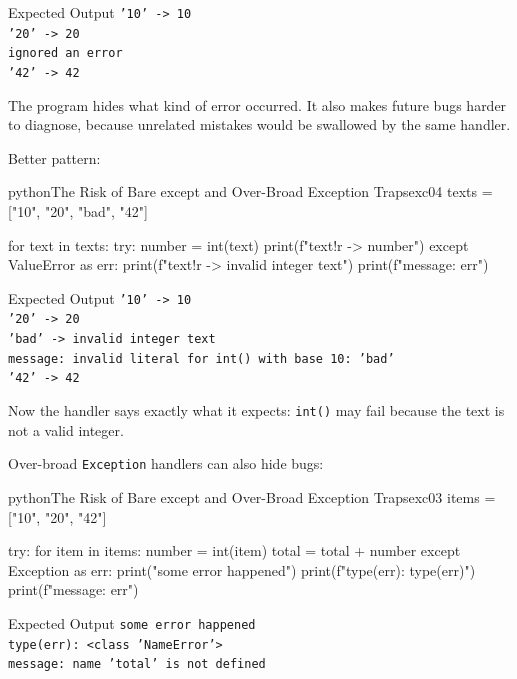 \begin{iobox}{Expected Output}
\texttt{'10' -> 10} \\
\texttt{'20' -> 20} \\
\texttt{ignored an error} \\
\texttt{'42' -> 42} \\
\end{iobox}


The program hides what kind of error occurred. It also makes future bugs harder to diagnose, because unrelated mistakes would be swallowed by the same handler.

Better pattern:

\begin{codebox}[]{python}{The Risk of Bare except and Over-Broad Exception Traps}{exc04}
texts = ["10", "20", "bad", "42"]

for text in texts:
    try:
        number = int(text)
        print(f"{text!r} -> {number}")
    except ValueError as err:
        print(f"{text!r} -> invalid integer text")
        print(f"message: {err}")
\end{codebox}


\begin{iobox}{Expected Output}
\texttt{'10' -> 10} \\
\texttt{'20' -> 20} \\
\texttt{'bad' -> invalid integer text} \\
\texttt{message: invalid literal for int() with base 10: 'bad'} \\
\texttt{'42' -> 42} \\
\end{iobox}


Now the handler says exactly what it expects: \texttt{int()} may fail because the text is not a valid integer.

Over-broad \texttt{Exception} handlers can also hide bugs:

\begin{codebox}[]{python}{The Risk of Bare except and Over-Broad Exception Traps}{exc03}
items = ["10", "20", "42"]

try:
    for item in items:
        number = int(item)
        total = total + number
except Exception as err:
    print("some error happened")
    print(f"type(err): {type(err)}")
    print(f"message: {err}")
\end{codebox}


\begin{iobox}{Expected Output}
\texttt{some error happened} \\
\texttt{type(err): <class 'NameError'>} \\
\texttt{message: name 'total' is not defined} \\
\end{iobox}


